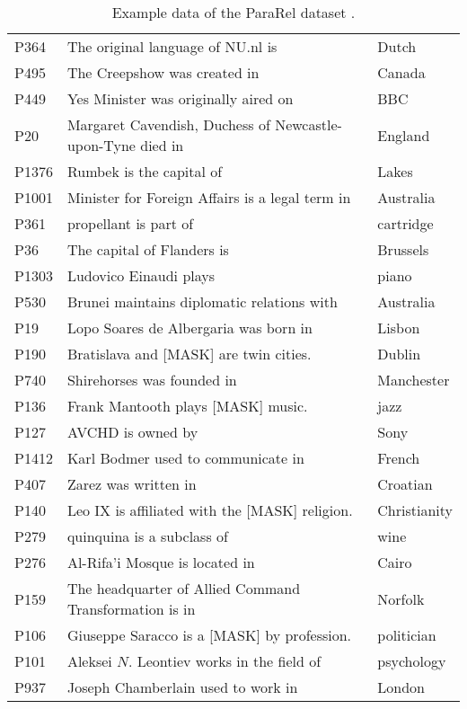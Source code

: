 \begin{table*}[t!]
\begin{tabular}{l l l}
{P364}  & The original language of NU.nl is & Dutch \\
{P495}  & The Creepshow was created in & Canada \\
{P449}  & Yes Minister was originally aired on & BBC \\
{P20}   & Margaret Cavendish, Duchess of Newcastle-upon-Tyne died in & England \\
{P1376} & Rumbek is the capital of & Lakes \\
{P1001} & Minister for Foreign Affairs is a legal term in & Australia \\
{P361}  & propellant is part of & cartridge \\
{P36}   & The capital of Flanders is & Brussels \\
{P1303} & Ludovico Einaudi plays & piano \\
{P530}  & Brunei maintains diplomatic relations with & Australia \\
{P19}   & Lopo Soares de Albergaria was born in & Lisbon \\
{P190}  & Bratislava and [MASK] are twin cities. & Dublin \\
{P740}  & Shirehorses was founded in & Manchester \\
{P136}  & Frank Mantooth plays [MASK] music. & jazz \\
{P127}  & AVCHD is owned by & Sony \\
{P1412} & Karl Bodmer used to communicate in & French \\
{P407}  & Zarez was written in & Croatian \\
{P140}  & Leo IX is affiliated with the [MASK] religion. & Christianity \\
{P279}  & quinquina is a subclass of & wine \\
{P276}  & Al-Rifa'i Mosque is located in & Cairo \\
{P159}  & The headquarter of Allied Command Transformation is in & Norfolk \\
{P106}  & Giuseppe Saracco is a [MASK] by profession. & politician \\
{P101}  & Aleksei $N$. Leontiev works in the field of & psychology \\
{P937}  & Joseph Chamberlain used to work in & London \\
\bottomrule
\end{tabular}
\caption{Example data of the ParaRel dataset \citep{elazar2021measuring-dataset}.}
\label{appendix:tab:relation_examples}
\end{table*}

